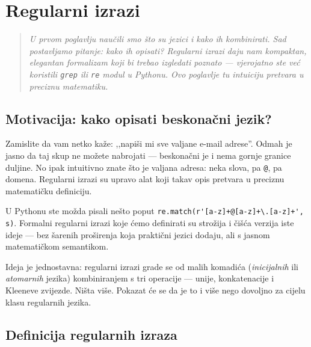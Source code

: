 \chapter{Regularni izrazi}
\label{chap:2}

\begin{quote}
\itshape
U prvom poglavlju naučili smo što su jezici i kako ih kombinirati.
Sad postavljamo pitanje: kako ih \emph{opisati}? Regularni izrazi daju
nam kompaktan, elegantan formalizam koji bi trebao izgledati poznato ---
vjerojatno ste već koristili \texttt{grep} ili \texttt{re} modul u Pythonu.
Ovo poglavlje tu intuiciju pretvara u preciznu matematiku.
\end{quote}


\section{Motivacija: kako opisati beskonačni jezik?}

Zamislite da vam netko kaže: ,,napiši mi sve valjane e-mail adrese''.
Odmah je jasno da taj skup ne možete nabrojati --- beskonačni je i nema
gornje granice duljine. No ipak intuitivno znate što je valjana adresa:
neka slova, pa \texttt{@}, pa domena. Regularni izrazi su upravo alat koji
takav opis pretvara u preciznu matematičku definiciju.

U Pythonu ste možda pisali nešto poput \verb|re.match(r'[a-z]+@[a-z]+\.[a-z]+', s)|.
Formalni regularni izrazi koje ćemo definirati su strožija i čišća verzija
iste ideje --- bez šarenih proširenja koja praktični jezici dodaju, ali s
jasnom matematičkom semantikom.

Ideja je jednostavna: regularni izrazi grade se od malih komadića
(\emph{inicijalnih} ili \emph{atomarnih} jezika) kombiniranjem s tri
operacije --- unije, konkatenacije i Kleeneve zvijezde. Ništa više.
Pokazat će se da je to i više nego dovoljno za cijelu klasu regularnih
jezika.

\section{Definicija regularnih izraza}

